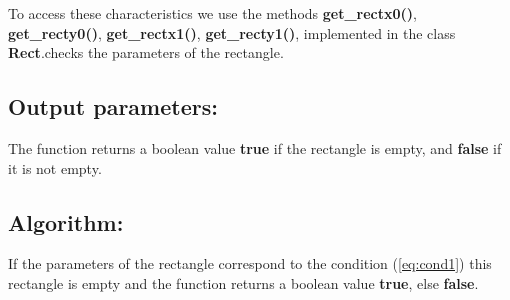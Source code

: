 \documentclass{report}
\begin{document}
To access these characteristics we use the methods  {\bfseries get\_rectx0()}, {\bfseries get\_recty0()}, {\bfseries get\_rectx1()}, {\bfseries get\_recty1()}, implemented in the class {\bfseries Rect}.checks the parameters  of the rectangle.

\subsection*{Output parameters:}

The function returns a boolean value {\bfseries true} if the rectangle is empty, and {\bfseries false} if it is not empty.

\subsection*{Algorithm:}

If the parameters of the rectangle correspond to the condition (\ref{eq:cond1}) this rectangle is empty and the function returns a boolean value {\bfseries true}, else  {\bfseries false}. 
\end{document}
